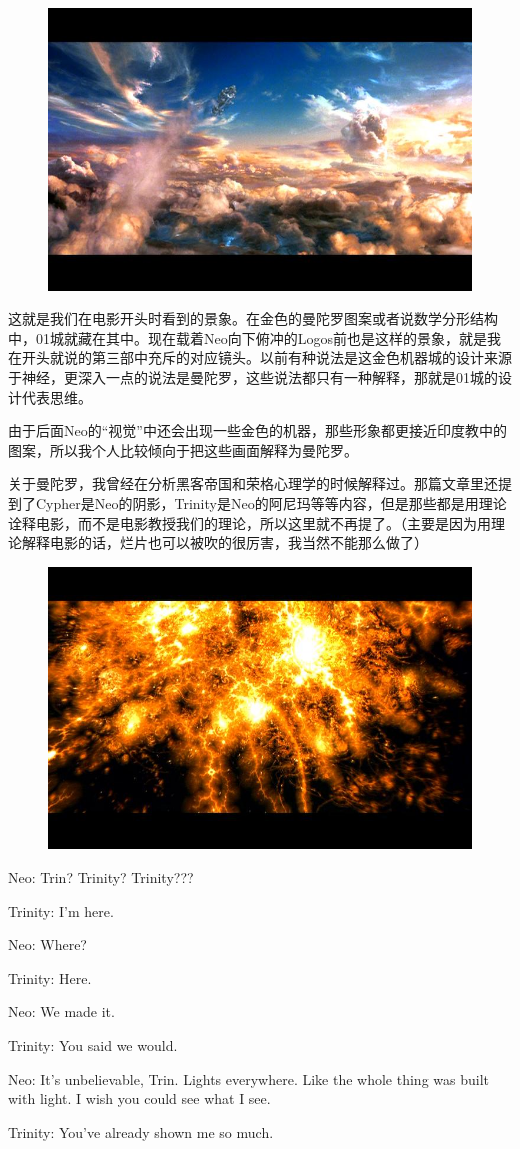 \documentclass[UTF8]{ctexart}
\newenvironment{myquote}{\color{green} \setlength{\leftskip}{6em} \setlength{\rightskip}{4em} \setlength{\parindent}{-2em}}{\par}
\begin{document}
\begin{figure}[htb]
\centering
\includegraphics[width=0.5\linewidth]{fig/ced7c8eaaf4124d2d539c997.jpg}
\end{figure}

这就是我们在电影开头时看到的景象。在金色的曼陀罗图案或者说数学分形结构中，01城就藏在其中。现在载着Neo向下俯冲的Logos前也是这样的景象，就是我在开头就说的第三部中充斥的对应镜头。以前有种说法是这金色机器城的设计来源于神经，更深入一点的说法是曼陀罗，这些说法都只有一种解释，那就是01城的设计代表思维。

由于后面Neo的“视觉”中还会出现一些金色的机器，那些形象都更接近印度教中的图案，所以我个人比较倾向于把这些画面解释为曼陀罗。

关于曼陀罗，我曾经在分析黑客帝国和荣格心理学的时候解释过。那篇文章里还提到了Cypher是Neo的阴影，Trinity是Neo的阿尼玛等等内容，但是那些都是用理论诠释电影，而不是电影教授我们的理论，所以这里就不再提了。（主要是因为用理论解释电影的话，烂片也可以被吹的很厉害，我当然不能那么做了）

\begin{figure}[htb]
\centering
\includegraphics[width=0.5\linewidth]{fig/af4b2cf5178e8c24bc3109b0.jpg}
\end{figure}

\begin{myquote}
Neo: Trin? Trinity? Trinity???

Trinity: I'm here.

Neo: Where?

Trinity: Here.

Neo: We made it.

Trinity: You said we would.

Neo: It's unbelievable, Trin. Lights everywhere. Like the whole thing was built with light. I wish you could see what I see.

Trinity: You've already shown me so much.
\end{myquote}
\end{document}
